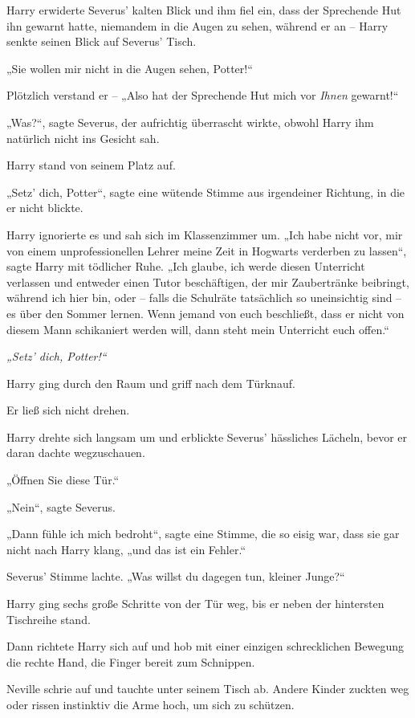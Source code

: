 {Harry erwiderte Severus' kalten Blick und ihm fiel ein, dass der Sprechende Hut ihn gewarnt hatte, niemandem in die Augen zu sehen, während er an -- Harry senkte seinen Blick auf Severus' Tisch.

„Sie wollen mir nicht in die Augen sehen, Potter!“

Plötzlich verstand er -- „Also hat der Sprechende Hut mich vor \emph{Ihnen} gewarnt!“

„Was?“, sagte Severus, der aufrichtig überrascht wirkte, obwohl Harry ihm natürlich nicht ins Gesicht sah.

Harry stand von seinem Platz auf.

„Setz' dich, Potter“, sagte eine wütende Stimme aus irgendeiner Richtung, in die er nicht blickte.

Harry ignorierte es und sah sich im Klassenzimmer um. „Ich habe nicht vor, mir von einem unprofessionellen Lehrer meine Zeit in Hogwarts verderben zu lassen“, sagte Harry mit tödlicher Ruhe. „Ich glaube, ich werde diesen Unterricht verlassen und entweder einen Tutor beschäftigen, der mir Zaubertränke beibringt, während ich hier bin, oder -- falls die Schulräte tatsächlich so uneinsichtig sind -- es über den Sommer lernen. Wenn jemand von euch beschließt, dass er nicht von diesem Mann schikaniert werden will, dann steht mein Unterricht euch offen.“

\emph{„Setz' dich, Potter!“}

Harry ging durch den Raum und griff nach dem Türknauf.

Er ließ sich nicht drehen.

Harry drehte sich langsam um und erblickte Severus' hässliches Lächeln, bevor er daran dachte wegzuschauen.

„Öffnen Sie diese Tür.“

„Nein“, sagte Severus.

„Dann fühle ich mich bedroht“, sagte eine Stimme, die so eisig war, dass sie gar nicht nach Harry klang, „und das ist ein Fehler.“

Severus' Stimme lachte. „Was willst du dagegen tun, kleiner Junge?“

Harry ging sechs große Schritte von der Tür weg, bis er neben der hintersten Tischreihe stand.

Dann richtete Harry sich auf und hob mit einer einzigen schrecklichen Bewegung die rechte Hand, die Finger bereit zum Schnippen.

Neville schrie auf und tauchte unter seinem Tisch ab. Andere Kinder zuckten weg oder rissen instinktiv die Arme hoch, um sich zu schützen.

}
